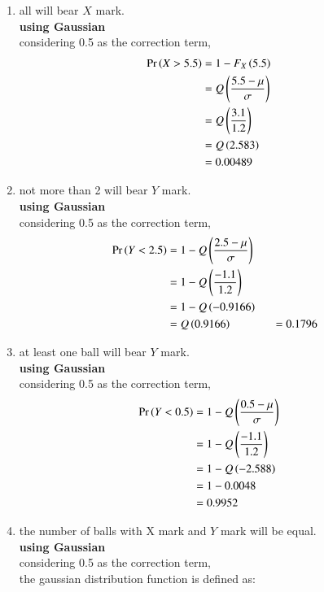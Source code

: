 \documentclass[journal,12pt,twocolumn]{IEEEtran}
\theoremstyle{remark}
\begin{document}
\begin{enumerate}[label=(\alph*)]
\item all will bear $X$ mark.\\
\textbf{using Gaussian} \\
considering 0.5 as the correction term,\\
\begin{align}
\Pr\left(X > 5.5\right) &= 1-F_X\left(5.5\right) \\
             &=Q\left(\frac{5.5-\mu}{\sigma}\right) \quad \\
             &= Q\left(\frac{3.1}{1.2}\right) \\
             &= Q\left(2.583\right) \\
             &= 0.00489
\end{align}
\item not more than 2 will bear $Y$ mark.\\  
\textbf{using Gaussian} \\
considering 0.5 as the correction term,\\
\begin{align}
\Pr\left(Y < 2.5\right) &= 1-Q\left(\frac{2.5-\mu}{\sigma}\right) \quad \\
             &= 1-Q\left(\frac{-1.1}{1.2}\right) \\
             &= 1-Q\left(-0.9166\right) \\
             &= Q\left(0.9166\right) 
             &= 0.1796
\end{align}
\item at least one ball will bear $Y$ mark.\\
\textbf{using Gaussian} \\
considering 0.5 as the correction term,\\
\begin{align}
\Pr\left(Y < 0.5\right) &= 1-Q\left(\frac{0.5-\mu}{\sigma}\right) \quad \\
             &= 1-Q\left(\frac{-1.1}{1.2}\right) \\
             &= 1-Q\left(-2.588\right) \\
             &= 1-0.0048\\
             &= 0.9952
\end{align}
\item the number of balls with X mark and $Y$ mark will be equal.\\
\textbf{using Gaussian} \\
considering 0.5 as the correction term,\\
the gaussian distribution function is defined as:
\begin{align}

\end{align}
\end{enumerate}
\end{document}
